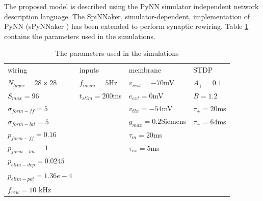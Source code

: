 \documentclass[sigconf]{acmart}
\begin{document}
The proposed model is described using the PyNN \cite{davison2009pynn} simulator independent network description language. 
The SpiNNaker, simulator-dependent, implementation of PyNN (sPyNNaker \cite{rhodes2018spynnaker}) has been extended to perform synaptic rewiring. 
Table \ref{tab:sim_params} contains the parameters used in the simulations.

\setlength{\tabcolsep}{4pt}
\begin{table}
\setlength{\tabcolsep}{18pt} %
\begin{center}
\caption{The parameters used in the simulations}
\label{tab:sim_params}
\begin{tabular}{llll}
\hline\noalign{\smallskip}
    wiring & inputs & membrane & STDP \\
\noalign{\smallskip}
\hline
\noalign{\smallskip}
    $N_{layer}=28\times28$ 	& $f_{mean}=5$Hz 	& $v_{rest} = -70$mV 	& $A_{+} = 0.1$ \\
    $S_{max}=96 $ 			& $t_{stim}=200$ms 	& $e_{ext} = 0$mV  		& $B = 1.2$	   \\
    $\sigma_{form-ff}=5$		& ~ 			& $v_{thr} = -54$mV 		& $\tau_{+} = 20$ms \\
    $\sigma_{form-lat}=5$ 		& ~ 			& $g_{max} = 0.2$Siemens& $\tau_{-} = 64$ms \\
    $p_{form-ff}=0.16$ 		    & ~  			& $\tau_{m}=20$ms  		& ~ \\
    $p_{form-lat}=1$ 			& ~  			& $\tau_{ex}=5$ms 		& ~ \\
    $p_{elim-dep}=0.0245$		& ~  			& ~                     & ~ \\
    $p_{elim-pot}=1.36 e -4$ 	& ~  			& ~	                    & ~ \\
    $f_{rew}=10$ kHz			& ~  			& ~                     & ~ \\
\hline
\end{tabular}
\end{center}
\end{table}
\setlength{\tabcolsep}{1.4pt}
\end{document}
